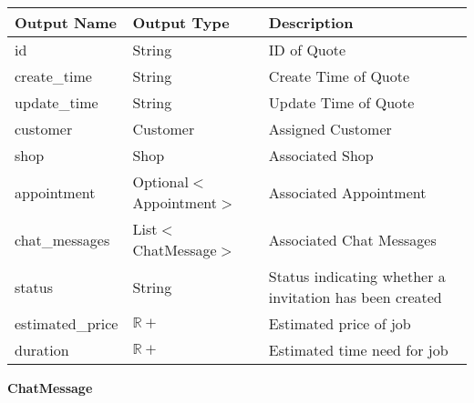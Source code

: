 \documentclass[12pt, titlepage]{article}
\begin{document}
\begin{table}[H]
	\begin{tabular}{|p{}|p{}|p{}|}
		\hline
		\textbf{Output Name} & \textbf{Output Type}      & \textbf{Description}                                    \\
		\hline
		id                   & String                    & ID of Quote                                             \\
		\hline
		create\_time         & String                    & Create Time of Quote                                    \\
		\hline
		update\_time         & String                    & Update Time of Quote                                    \\
		\hline
		customer             & Customer                  & Assigned Customer                                       \\
		\hline
		shop                 & Shop                      & Associated Shop                                         \\
		\hline
		appointment          & Optional$<$Appointment$>$ & Associated Appointment                                  \\
		\hline
		chat\_messages       & List$<$ChatMessage$>$     & Associated Chat Messages                                \\
		\hline
		status               & String                    & Status indicating whether a invitation has been created \\
		\hline
		estimated\_price     & $\mathbb{R}+$             & Estimated price of job                                  \\
		\hline
		duration             & $\mathbb{R}+$             & Estimated time need for job                             \\
		\hline
	\end{tabular}
\end{table}

\textbf{ChatMessage}
\end{document}

